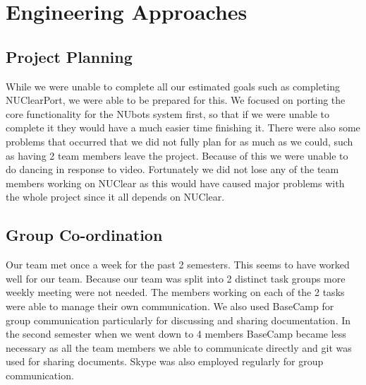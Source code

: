 \documentclass[english,12pt]{scrartcl}
\begin{document}
\section{Engineering Approaches}
	\subsection{Project Planning}
		While we were unable to complete all our estimated goals such as completing NUClearPort, we were able to be prepared for this.
		We focused on porting the core functionality for the NUbots system first, so that if we were unable to complete it they would have a much easier time finishing it.
		There were also some problems that occurred that we did not fully plan for as much as we could, such as having 2 team members leave the project.
		Because of this we were unable to do dancing in response to video.
		Fortunately we did not lose any of the team members working on NUClear as this would have caused major problems with the whole project since it all depends on NUClear.
	
	\subsection{Group Co-ordination}
		Our team met once a week for the past 2 semesters. This seems to have worked well for our team.
		Because our team was split into 2 distinct task groups more weekly meeting were not needed.
		The members working on each of the 2 tasks were able to manage their own communication.
		We also used BaseCamp for group communication particularly for discussing and sharing documentation.
		In the second semester when we went down to 4 members BaseCamp became less necessary as all the team members we able to communicate directly and git was used for sharing documents.
		Skype was also employed regularly for group communication.
	
\end{document}
